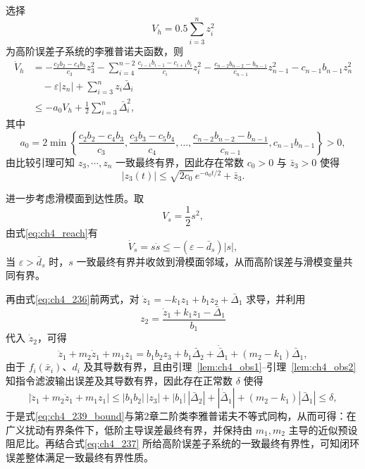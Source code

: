 选择
\begin{equation}
V_h=0.5\sum_{i=3}^{n} z_i^2
\end{equation}
为高阶误差子系统的李雅普诺夫函数，则
\begin{equation}\label{eq:ch4_237}
\begin{aligned}
\dot V_h
&= -\frac{c_2b_2-c_4b_3}{c_3}z_3^2-\sum_{i=4}^{n-2}\frac{c_{i-1}b_{i-1}-c_{i+1}b_i}{c_i}z_i^2
-\frac{c_{n-2}b_{n-2}-b_{n-1}}{c_{n-1}}z_{n-1}^2-c_{n-1}b_{n-1}z_n^2 \\
&\quad -\varepsilon |z_n|+\sum_{i=3}^{n}z_i\bar\Delta_i \\
&\le -a_0V_h + \frac{1}{2}\sum_{i=3}^{n}\bar\Delta_i^2,
\end{aligned}
\end{equation}
其中
\begin{equation}
a_0=2\min\left\{\frac{c_2b_2-c_4b_3}{c_3},\frac{c_3b_3-c_5b_4}{c_4},\ldots,\frac{c_{n-2}b_{n-2}-b_{n-1}}{c_{n-1}},c_{n-1}b_{n-1}\right\}>0,
\end{equation}
由比较引理可知 $z_3,\cdots,z_n$ 一致最终有界，因此存在常数 $c_0>0$ 与 $\bar z_3>0$ 使得
\begin{equation}\label{eq:ch4_238}
|z_3(t)|\le \sqrt{2c_0}\,e^{-a_0 t/2}+\bar z_3.
\end{equation}

进一步考虑滑模面到达性质。取
\begin{equation}
V_s=\frac{1}{2}s^2,
\end{equation}
由式\eqref{eq:ch4_reach}有
\begin{equation}\label{eq:ch4_Vs_dot}
\dot V_s=s\dot s\le -(\varepsilon-\bar d_s)|s|,
\end{equation}
当 $\varepsilon>\bar d_s$ 时，$s$ 一致最终有界并收敛到滑模面邻域，从而高阶误差与滑模变量共同有界。

再由式\eqref{eq:ch4_236}前两式，对 $\dot z_1=-k_1z_1+b_1z_2+\bar\Delta_1$ 求导，并利用
\begin{equation}
z_2=\frac{\dot z_1+k_1z_1-\bar\Delta_1}{b_1}
\end{equation}
代入 $\dot z_2$，可得
\begin{equation}\label{eq:ch4_239}
\ddot z_1+m_2\dot z_1+m_1z_1=b_1b_2z_3+b_1\bar\Delta_2+\dot{\bar\Delta}_1+(m_2-k_1)\bar\Delta_1,
\end{equation}
由于 $f_i(\bar x_i)$、$d_i$ 及其导数有界，且由引理~\ref{lem:ch4_obs1}--引理~\ref{lem:ch4_obs2}知指令滤波输出误差及其导数有界，因此存在正常数 $\delta$ 使得
\begin{equation}\label{eq:ch4_239_bound}
\left|\ddot z_1+m_2\dot z_1+m_1z_1\right|
\le |b_1b_2|\,|z_3|+|b_1|\,|\bar\Delta_2|+|\dot{\bar\Delta}_1|+(m_2-k_1)|\bar\Delta_1|
\le \delta,
\end{equation}
于是式\eqref{eq:ch4_239_bound}与第2章二阶类李雅普诺夫不等式同构，从而可得：在广义扰动有界条件下，低阶主导误差最终有界，并保持由 $m_1,m_2$ 主导的近似预设阻尼比。再结合式\eqref{eq:ch4_237} 所给高阶误差子系统的一致最终有界性，可知闭环误差整体满足一致最终有界性质。

